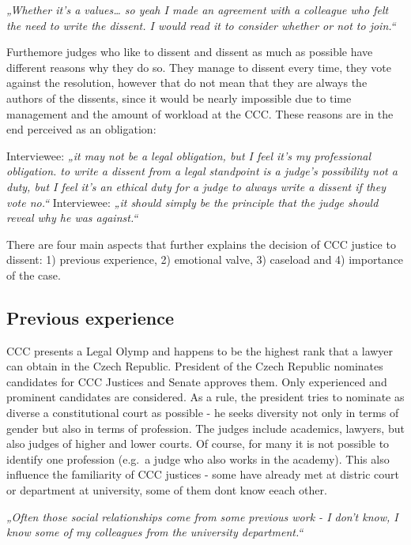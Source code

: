 \documentclass[
  11pt,
]{article}
\begin{document}
\emph{„Whether it's a values\ldots{} so yeah I made an agreement with a
colleague who felt the need to write the dissent. I would read it to
consider whether or not to join.``}

Furthemore judges who like to dissent and dissent as much as possible
have different reasons why they do so. They manage to dissent every
time, they vote against the resolution, however that do not mean that
they are always the authors of the dissents, since it would be nearly
impossible due to time management and the amount of workload at the CCC.
These reasons are in the end perceived as an obligation:

Interviewee: \emph{„it may not be a legal obligation, but I feel it's my
professional obligation. to write a dissent from a legal standpoint is a
judge's possibility not a duty, but I feel it's an ethical duty for a
judge to always write a dissent if they vote no.``} Interviewee:
\emph{„it should simply be the principle that the judge should reveal
why he was against.``}

There are four main aspects that further explains the decision of CCC
justice to dissent: 1) previous experience, 2) emotional valve, 3)
caseload and 4) importance of the case.

\hypertarget{previous-experience}{%
\subsection{Previous experience}\label{previous-experience}}

CCC presents a Legal Olymp and happens to be the highest rank that a
lawyer can obtain in the Czech Republic. President of the Czech Republic
nominates candidates for CCC Justices and Senate approves them. Only
experienced and prominent candidates are considered. As a rule, the
president tries to nominate as diverse a constitutional court as
possible - he seeks diversity not only in terms of gender but also in
terms of profession. The judges include academics, lawyers, but also
judges of higher and lower courts. Of course, for many it is not
possible to identify one profession (e.g.~a judge who also works in the
academy). This also influence the familiarity of CCC justices - some
have already met at distric court or department at university, some of
them dont know eeach other.

\emph{„Often those social relationships come from some previous work - I
don't know, I know some of my colleagues from the university
department.``}
\end{document}
